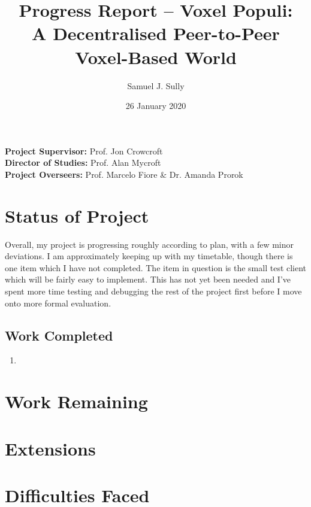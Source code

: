 \documentclass[11pt,a4paper]{article}
\begin{document}
	\title{Progress Report -- Voxel Populi:\\ A Decentralised Peer-to-Peer Voxel-Based World}
	\author{Samuel J. Sully}
	\date{26 January 2020}
	\maketitle
	\thispagestyle{empty}
	
	\noindent
	\textbf{Project Supervisor:} Prof. Jon Crowcroft\\
	\textbf{Director of Studies:} Prof. Alan Mycroft\\
	\textbf{Project Overseers:} Prof. Marcelo Fiore \&  Dr. Amanda Prorok

	\section{Status of Project}
	Overall, my project is progressing roughly according to plan, with a few minor deviations. I am approximately keeping up with my timetable, though there is one item which I have not completed. The item in question is the small test client which will be fairly easy to implement. This has not yet been needed and I've spent more time testing and debugging the rest of the project first before I move onto more formal evaluation.
	
	\subsection{Work Completed}
	\begin{enumerate}
		\item 
	\end{enumerate}
	\section{Work Remaining}
	
	\section{Extensions}
	
	\section{Difficulties Faced}
	
	\begin{thebibliography}{9}
			
	\end{thebibliography}
\end{document}
